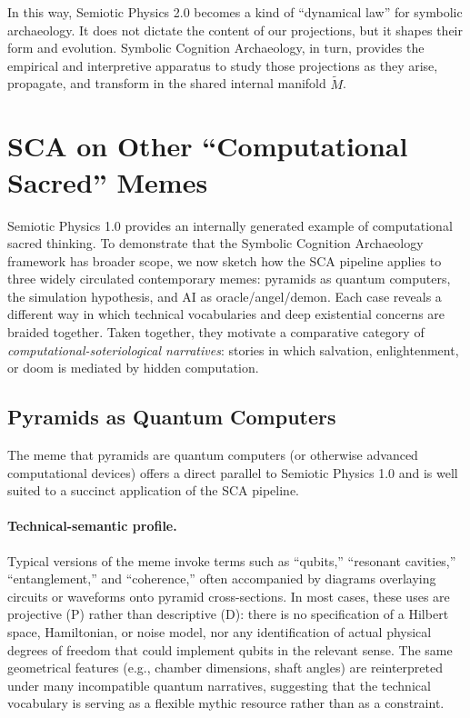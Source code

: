 \documentclass[12]{amsart}
\theoremstyle{plain}
\begin{document}
In this way, Semiotic Physics 2.0 becomes a kind of ``dynamical law'' for symbolic archaeology. It does not dictate the content of our projections, but it shapes their form and evolution. Symbolic Cognition Archaeology, in turn, provides the empirical and interpretive apparatus to study those projections as they arise, propagate, and transform in the shared internal manifold $\tilde M$.

\section{SCA on Other ``Computational Sacred'' Memes}

Semiotic Physics 1.0 provides an internally generated example of computational sacred thinking. To demonstrate that the Symbolic Cognition Archaeology framework has broader scope, we now sketch how the SCA pipeline applies to three widely circulated contemporary memes: pyramids as quantum computers, the simulation hypothesis, and AI as oracle/angel/demon. Each case reveals a different way in which technical vocabularies and deep existential concerns are braided together. Taken together, they motivate a comparative category of \emph{computational-soteriological narratives}: stories in which salvation, enlightenment, or doom is mediated by hidden computation.

\subsection{Pyramids as Quantum Computers}

The meme that pyramids are quantum computers (or otherwise advanced computational devices) offers a direct parallel to Semiotic Physics 1.0 and is well suited to a succinct application of the SCA pipeline.

\paragraph{Technical-semantic profile.} Typical versions of the meme invoke terms such as ``qubits,'' ``resonant cavities,'' ``entanglement,'' and ``coherence,'' often accompanied by diagrams overlaying circuits or waveforms onto pyramid cross-sections. In most cases, these uses are projective (\textsc{P}) rather than descriptive (\textsc{D}): there is no specification of a Hilbert space, Hamiltonian, or noise model, nor any identification of actual physical degrees of freedom that could implement qubits in the relevant sense. The same geometrical features (e.g., chamber dimensions, shaft angles) are reinterpreted under many incompatible quantum narratives, suggesting that the technical vocabulary is serving as a flexible mythic resource rather than as a constraint.
\end{document}
